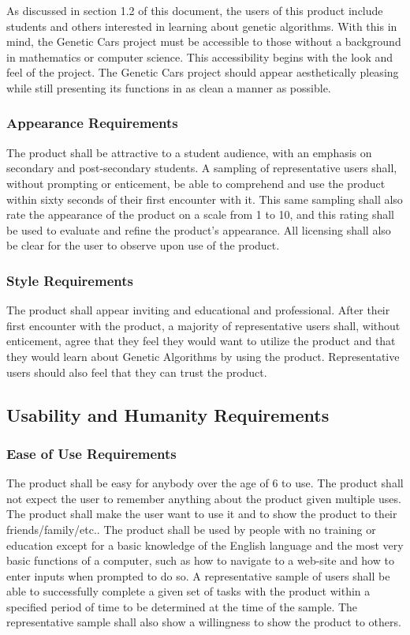 \documentclass[12pt, titlepage]{article}
\begin{document}
As discussed in section 1.2 of this document, the users of this product include students and others interested in learning about genetic algorithms. With this in mind, the Genetic Cars project must be accessible to those without a background in mathematics or computer science. This accessibility begins with the look and feel of the project. The Genetic Cars project should appear aesthetically pleasing while still presenting its functions in as clean a manner as possible.

\subsubsection{Appearance Requirements}

The product shall be attractive to a student audience, with an emphasis on secondary and post-secondary students. A sampling of representative users shall, without prompting or enticement, be able to comprehend and use the product within sixty seconds of their first encounter with it. This same sampling shall also rate the appearance of the product on a scale from 1 to 10, and this rating shall be used to evaluate and refine the product's appearance. All licensing shall also be clear for the user to observe upon use of the product.

\subsubsection{Style Requirements}

The product shall appear inviting and educational and professional. After their first encounter with the product, a majority of representative users shall, without enticement, agree that they feel they would want to utilize the product and that they would learn about Genetic Algorithms by using the product. Representative users should also feel that they can trust the product.

\subsection{Usability and Humanity Requirements}

\subsubsection{Ease of Use Requirements}

The product shall be easy for anybody over the age of 6 to use. The product shall not expect the user to remember anything about the product given multiple uses. The product shall make the user want to use it and to show the product to their friends/family/etc.. The product shall be used by people with no training or education except for a basic knowledge of the English language and the most very basic functions of a computer, such as how to navigate to a web-site and how to enter inputs when prompted to do so. A representative sample of users shall be able to successfully complete a given set of tasks with the product within a specified period of time to be determined at the time of the sample. The representative sample shall also show a willingness to show the product to others.
\end{document}
